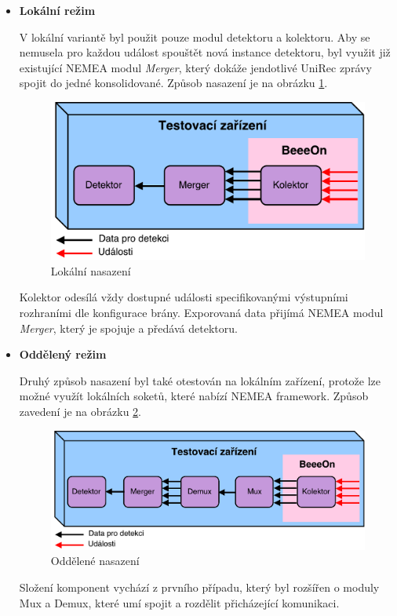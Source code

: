 \begin{itemize}
  \item \textbf{Lokální režim}
  
  V lokální variantě byl použit pouze modul detektoru a kolektoru. Aby se nemusela pro každou 
  událost spouštět nová instance detektoru, byl využit již existující NEMEA modul \textit{Merger},
  který 
  dokáže jendotlivé UniRec zprávy spojit do jedné konsolidované. Způsob nasazení je na obrázku 
  \ref{obr.option1}.
  \begin{figure}[ht]
   \begin{center}
   \includegraphics[scale=0.5]{pictures/deploy-option1}
   \caption{Lokální nasazení}
   \label{obr.option1}
   \end{center}
   \end{figure}
   
   Kolektor odesílá vždy dostupné události specifikovanými výstupními rozhraními dle konfigurace brány.
   Exporovaná data přijímá NEMEA modul \textit{Merger}, který je spojuje a předává detektoru.
   
  \item \textbf{Oddělený režim}
  
  Druhý způsob nasazení byl také otestován na lokálním zařízení, protože lze možné využít lokálních
  soketů, které nabízí NEMEA framework. Způsob zavedení je na obrázku \ref{obr.option2}.
 
  \begin{figure}[ht]
   \begin{center}
   \includegraphics[scale=0.5]{pictures/deploy-option2}
   \caption{Oddělené nasazení}
   \label{obr.option2}
   \end{center}
   \end{figure}
   
   Složení komponent vychází z prvního případu, který byl rozšířen o moduly Mux a Demux, které 
   umí spojit a rozdělit přicházející komunikaci.
 \end{itemize}
 

